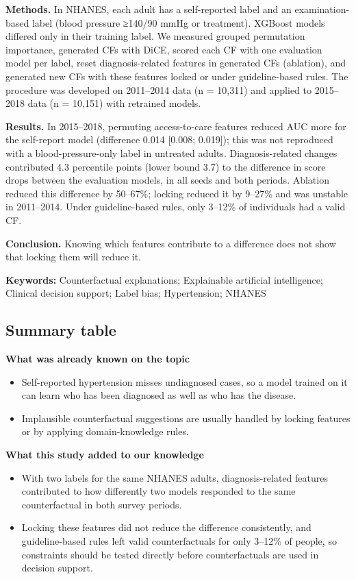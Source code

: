 \documentclass[
  11pt,
]{article}
\providecommand{\tightlist}{%
  \setlength{\itemsep}{0pt}\setlength{\parskip}{0pt}}
\begin{document}
\textbf{Methods.} In NHANES, each adult has a self-reported label and an
examination-based label (blood pressure ≥140/90 mmHg or treatment).
XGBoost models differed only in their training label. We measured
grouped permutation importance, generated CFs with DiCE, scored each CF
with one evaluation model per label, reset diagnosis-related features in
generated CFs (ablation), and generated new CFs with these features
locked or under guideline-based rules. The procedure was developed on
2011--2014 data (n = 10,311) and applied to 2015--2018 data (n = 10,151)
with retrained models.

\textbf{Results.} In 2015--2018, permuting access-to-care features
reduced AUC more for the self-report model (difference 0.014 {[}0.008;
0.019{]}); this was not reproduced with a blood-pressure-only label in
untreated adults. Diagnosis-related changes contributed 4.3 percentile
points (lower bound 3.7) to the difference in score drops between the
evaluation models, in all seeds and both periods. Ablation reduced this
difference by 50--67\%; locking reduced it by 9--27\% and was unstable
in 2011--2014. Under guideline-based rules, only 3--12\% of individuals
had a valid CF.

\textbf{Conclusion.} Knowing which features contribute to a difference
does not show that locking them will reduce it.

\textbf{Keywords:} Counterfactual explanations; Explainable artificial
intelligence; Clinical decision support; Label bias; Hypertension;
NHANES

\subsection{Summary table}

\textbf{What was already known on the topic}

\begin{itemize}
\tightlist
\item
  Self-reported hypertension misses undiagnosed cases, so a model
  trained on it can learn who has been diagnosed as well as who has the
  disease.
\item
  Implausible counterfactual suggestions are usually handled by locking
  features or by applying domain-knowledge rules.
\end{itemize}

\textbf{What this study added to our knowledge}

\begin{itemize}
\tightlist
\item
  With two labels for the same NHANES adults, diagnosis-related features
  contributed to how differently two models responded to the same
  counterfactual in both survey periods.
\item
  Locking these features did not reduce the difference consistently, and
  guideline-based rules left valid counterfactuals for only 3--12\% of
  people, so constraints should be tested directly before
  counterfactuals are used in decision support.
\end{itemize}
\end{document}
